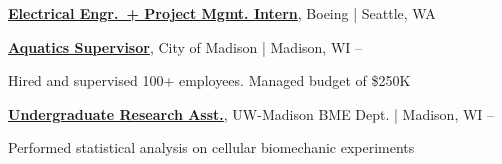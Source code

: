 \BigGap\Entry\href{}
{\textbf{Electrical Engr.~+ Project Mgmt. Intern}},
Boeing | Seattle, WA\hfill
{}

\BigGap\Entry\href{}
{\textbf{Aquatics Supervisor}},
City of Madison | Madison, WI\hfill
{} -- 
\begin{Detail}
\BulletItem
Hired and supervised 100+ employees. Managed budget of \$250K 
\end{Detail}

\BigGap\Entry\href{}
{\textbf{Undergraduate Research Asst.}},
UW-Madison BME Dept. | Madison, WI\hfill
{} -- 
\begin{Detail}
\BulletItem
Performed statistical analysis on cellular biomechanic experiments 
\end{Detail}